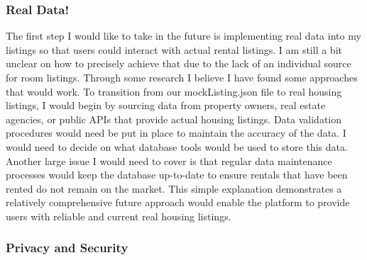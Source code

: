 \documentclass[10pt,twocolumn]{article}
\begin{document}
\subsubsection{Real Data!}
The first step I would like to take in the future is implementing real data into my listings so that users could interact with actual rental listings. I am still a bit unclear on how to precisely achieve that due to the lack of an individual source for room listings. Through some research I believe I have found some approaches that would work. To transition from our mockListing.json file to real housing listings, I would begin by sourcing data from property owners, real estate agencies, or public APIs that provide actual housing listings. Data validation procedures would need be put in place to maintain the accuracy of the data. I would need to decide on what database tools would be used to store this data. Another large issue I would need to cover is that regular data maintenance processes would keep the database up-to-date to ensure rentals that have been rented do not remain on the market. This simple explanation demonstrates a relatively comprehensive future approach would enable the platform to provide users with reliable and current real housing listings.


\subsubsection{Privacy and Security} 
\end{document}
